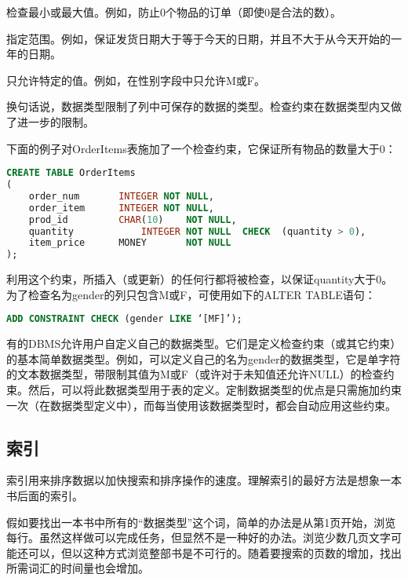 \begin{compactitem}
\item 检查最小或最大值。例如，防止0个物品的订单（即使0是合法的数）。
\item 指定范围。例如，保证发货日期大于等于今天的日期，并且不大于从今天开始的一年的日期。
\item 只允许特定的值。例如，在性别字段中只允许M或F。
\end{compactitem}

换句话说，数据类型限制了列中可保存的数据的类型。检查约束在数据类型内又做了进一步的限制。


下面的例子对OrderItems表施加了一个检查约束，它保证所有物品的数量大于0：

\begin{lstlisting}[language=SQL]
CREATE TABLE OrderItems
(
	order_num		INTEGER	NOT NULL,
	order_item		INTEGER	NOT NULL,
	prod_id			CHAR(10)	NOT NULL,
	quantity			INTEGER	NOT NULL  CHECK  (quantity > 0),
	item_price		MONEY		NOT NULL
);
\end{lstlisting}


利用这个约束，所插入（或更新）的任何行都将被检查，以保证quantity大于0。为了检查名为gender的列只包含M或F，可使用如下的ALTER TABLE语句：

\begin{lstlisting}[language=SQL]
ADD CONSTRAINT CHECK (gender LIKE ‘[MF]’);
\end{lstlisting}




有的DBMS允许用户自定义自己的数据类型。它们是定义检查约束（或其它约束）的基本简单数据类型。例如，可以定义自己的名为gender的数据类型，它是单字符的文本数据类型，带限制其值为M或F（或许对于未知值还允许NULL）的检查约束。然后，可以将此数据类型用于表的定义。定制数据类型的优点是只需施加约束一次（在数据类型定义中），而每当使用该数据类型时，都会自动应用这些约束。








\subsection{索引}

索引用来排序数据以加快搜索和排序操作的速度。理解索引的最好方法是想象一本书后面的索引。

假如要找出一本书中所有的“数据类型”这个词，简单的办法是从第1页开始，浏览每行。虽然这样做可以完成任务，但显然不是一种好的办法。浏览少数几页文字可能还可以，但以这种方式浏览整部书是不可行的。随着要搜索的页数的增加，找出所需词汇的时间量也会增加。

